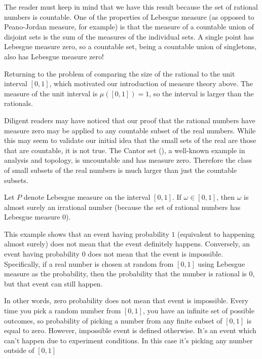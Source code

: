 	The reader must keep in mind that we have this result because the set of rational numbers is countable. One of the properties of Lebesgue measure (as opposed to Peano-Jordan measure, for example) is that the measure of a countable union of disjoint sets is the sum of the measures of the individual sets. A single point has Lebesgue measure zero, so a countable set, being a countable union of singletons, also has Lebesgue measure zero!
	
	Returning to the problem of comparing the size of the rational to the unit interval $[0,1]$, which motivated our introduction of measure theory above. The measure of the unit interval is $\mu([0,1])=1$, so the interval is larger than the rationals.
	
	\begin{tcolorbox}[enhanced,title=Remark,colframe=black,arc=10pt,drop lifted shadow,after skip=15pt plus 2pt]
	Diligent readers may have noticed that our proof that the rational numbers have measure zero may be applied to any countable subset of the real numbers. While this may seem to validate our initial idea that the small sets of the real are those that are countable, it is not true. The Cantor set (), a well-known example in analysis and topology, is uncountable and has measure zero. Therefore the class of small subsets of the real numbers is much larger than just the countable subsets.
	\end{tcolorbox}
	
	Let $P$ denote Lebesgue measure on the interval $[0, 1]$. If $\omega \in [0, 1]$, then $\omega$ is almost surely an irrational number (because the set of rational numbers has Lebesgue measure $0$).

	This example shows that an event having probability $1$ (equivalent to happening almost surely) does not mean that the event definitely happens. Conversely, an event having probability $0$ does not mean that the event is impossible. Specifically, if a real number is chosen at random from $[0, 1]$ using Lebesgue measure as the probability, then the probability that the number is rational is $0$, but that event can still happen.
	
	In other words, zero probability does not mean that event is impossible. Every time you pick a random number from $[0,1]$, you have an infinite set of possible outcomes, so probability of picking a number from any finite subset of $[0,1]$ is equal to zero. However, impossible event is defined otherwise. It's an event which can't happen due to experiment conditions. In this case it's picking any number outside of $[0,1]$
	
